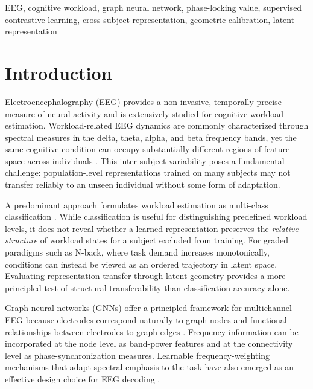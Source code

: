 \documentclass{ieeeaccess}
\begin{document}
\begin{keywords}
EEG, cognitive workload, graph neural network, phase-locking value,
supervised contrastive learning, cross-subject representation,
geometric calibration, latent representation
\end{keywords}

\titlepgskip=-15pt
\makeatletter
\gdef\thevol{14}
\gdef\theyear{2026}
\makeatother
\maketitle

\section{Introduction}
\label{sec:intro}

Electroencephalography (EEG) provides a non-invasive, temporally precise
measure of neural activity and is extensively studied for cognitive workload
estimation. Workload-related EEG dynamics are commonly characterized through
spectral measures in the delta, theta, alpha, and beta frequency bands, yet
the same cognitive condition can occupy substantially different regions of
feature space across individuals \cite{chikhi2022}. This inter-subject
variability poses a fundamental challenge: population-level representations
trained on many subjects may not transfer reliably to an unseen individual
without some form of adaptation.

A predominant approach formulates workload estimation as multi-class
classification \cite{cao2022,wei2025}. While classification is useful for
distinguishing predefined workload levels, it does not reveal whether a
learned representation preserves the \emph{relative structure} of workload
states for a subject excluded from training. For graded paradigms such as
N-back, where task demand increases monotonically, conditions can instead be
viewed as an ordered trajectory in latent space. Evaluating representation
transfer through latent geometry provides a more principled test of
structural transferability than classification accuracy alone.

Graph neural networks (GNNs) offer a principled framework for multichannel
EEG because electrodes correspond naturally to graph nodes and functional
relationships between electrodes to graph edges \cite{klepl2024}. Frequency
information can be incorporated at the node level as band-power features and
at the connectivity level as phase-synchronization measures. Learnable
frequency-weighting mechanisms that adapt spectral emphasis to the task have
also emerged as an effective design choice for EEG decoding \cite{ding2025freq}.
\end{document}
